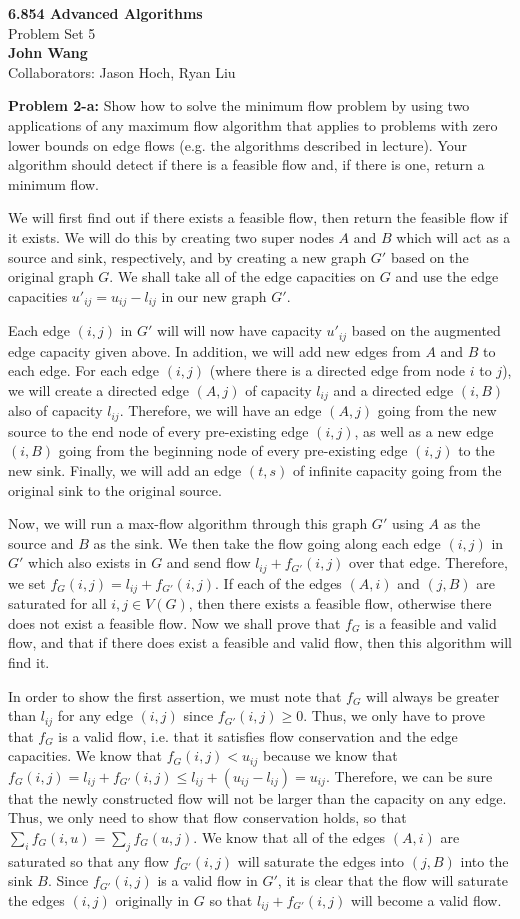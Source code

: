 \documentclass[psamsfonts]{amsart}
\newenvironment{sol}{\vspace{0.25cm}{\large \bfseries Solution:}}{\qedsymbol}
\newenvironment{prob}[1]{\begin{framed}{\large \bfseries Problem #1:}}{\end{framed}}
\newcommand{\makenewtitle}{
    \begin{center}
    {\huge \bfseries 6.854 Advanced Algorithms} \\
    Problem Set 5\\
    \vspace{0.25cm}
    {\bfseries John Wang} \\
    Collaborators: Jason Hoch, Ryan Liu
    \end{center}
    \vspace{0.5cm}
}
\begin{document}
\newpage
\makenewtitle

\begin{prob}{2-a}
Show how to solve the minimum flow problem by using two applications of any maximum flow algorithm that applies to problems with zero lower bounds on edge flows (e.g. the algorithms described in lecture). Your algorithm should detect if there is a feasible flow and, if there is one, return a minimum flow.
\end{prob}
\begin{sol}
We will first find out if there exists a feasible flow, then return the feasible flow if it exists. We will do this by creating two super nodes $A$ and $B$ which will act as a source and sink, respectively, and by creating a new graph $G'$ based on the original graph $G$. We shall take all of the edge capacities on $G$ and use the edge capacities $u'_{ij} = u_{ij} - l_{ij}$ in our new graph $G'$. 

Each edge $(i,j)$ in $G'$ will will now have capacity $u'_{ij}$ based on the augmented edge capacity given above. In addition, we will add new edges from $A$ and $B$ to each edge. For each edge $(i,j)$ (where there is a directed edge from node $i$ to $j$), we will create a directed edge $(A, j)$ of capacity $l_{ij}$ and a directed edge $(i, B)$ also of capacity $l_{ij}$. Therefore, we will have an edge $(A, j)$ going from the new source to the end node of every pre-existing edge $(i,j)$, as well as a new edge $(i, B)$ going from the beginning node of every pre-existing edge $(i,j)$ to the new sink. Finally, we will add an edge $(t,s)$ of infinite capacity going from the original sink to the original source. 

Now, we will run a max-flow algorithm through this graph $G'$ using $A$ as the source and $B$ as the sink. We then take the flow going along each edge $(i,j)$ in $G'$ which also exists in $G$ and send flow $l_{ij} + f_{G'}(i,j)$ over that edge. Therefore, we set $f_{G}(i,j) = l_{ij} + f_{G'}(i,j)$. If each of the edges $(A,i)$ and $(j, B)$ are saturated for all $i,j \in V(G)$, then there exists a feasible flow, otherwise there does not exist a feasible flow. Now we shall prove that $f_G$ is a feasible and valid flow, and that if there does exist a feasible and valid flow, then this algorithm will find it.

In order to show the first assertion, we must note that $f_G$ will always be greater than $l_{ij}$ for any edge $(i,j)$ since $f_{G'}(i,j) \geq 0$. Thus, we only have to prove that $f_G$ is a valid flow, i.e. that it satisfies flow conservation and the edge capacities. We know that $f_G(i,j) < u_{ij}$ because we know that $f_G(i,j) = l_{ij} + f_{G'}(i,j) \leq l_{ij} + (u_{ij} - l_{ij}) = u_{ij}$. Therefore, we can be sure that the newly constructed flow will not be larger than the capacity on any edge. Thus, we only need to show that flow conservation holds, so that $\sum_{i} f_{G}(i,u) = \sum_{j} f_{G}(u, j)$. We know that all of the edges $(A,i)$ are saturated so that any flow $f_{G'}(i,j)$ will saturate the edges into $(j,B)$ into the sink $B$. Since $f_{G'}(i,j)$ is a valid flow in $G'$, it is clear that the flow will saturate the edges $(i,j)$ originally in $G$ so that $l_{ij} + f_{G'}(i,j)$ will become a valid flow.


\end{sol}
\end{document}
